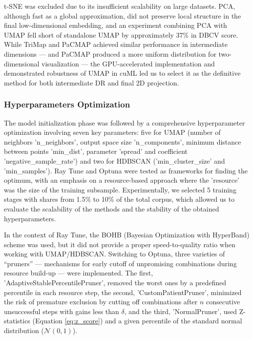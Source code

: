 t-SNE was excluded due to its insufficient scalability on large datasets. PCA, although fast as a global approximation,
did not preserve local structure in the final low-dimensional embedding, and an experiment combining PCA with UMAP fell
short of standalone UMAP by approximately 37\% in DBCV score. While TriMap and PaCMAP achieved similar performance
in intermediate dimensions --- and PaCMAP produced a more uniform distribution for two-dimensional visualization ---
the GPU-accelerated implementation and demonstrated robustness of UMAP in cuML led us to select it as the definitive method
for both intermediate DR and final 2D projection.

\subsubsection{Hyperparameters Optimization}
The model initialization phase was followed by a comprehensive hyperparameter optimization involving seven key parameters:
five for UMAP (number of neighbors 'n\_neighbors', output space size 'n\_components', minimum distance between points 'min\_dist',
parameter 'spread' and coefficient 'negative\_sample\_rate') and two for HDBSCAN ('min\_cluster\_size' and 'min\_samples'). Ray Tune
\parencite{raytune2018liaw} and Optuna \parencite{optuna2019akiba} were tested as frameworks for finding the optimum,
with an emphasis on a resource-based approach where the 'resource' was the size of the training subsample.
Experimentally, we selected 5 training stages with shares from 1.5\% to 10\% of the total corpus, which allowed us
to evaluate the scalability of the methods and the stability of the obtained hyperparameters.

In the context of Ray Tune, the BOHB (Bayesian Optimization with HyperBand) scheme
\parencite{TPEandBO2011bergstra, BOHB2018falkner, hyperband2018li, HPOoverview2015shahriari} was used, but it did not provide
a proper speed-to-quality ratio when working with UMAP/HDBSCAN. Switching to Optuna, three varieties of “pruners” ---
mechanisms for early cutoff of unpromising combinations during resource build-up --- were implemented. The first,
'AdaptiveStablePercentilePruner', removed the worst ones by a predefined percentile in each resource step, the second,
'CustomPatientPruner', minimized the risk of premature exclusion by cutting off combinations after $n$ consecutive
unsuccessful steps with gains less than $\delta$, and the third, 'NormalPruner', used Z-statistics
(Equation \ref{eq:z_score}) and a given percentile of the standard normal distribution ($\mathcal{N}(0, 1)$).

